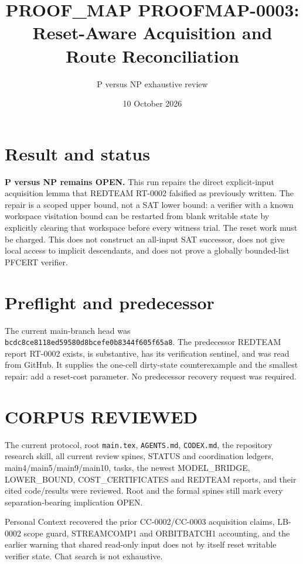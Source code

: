 \documentclass[11pt]{article}
\title{PROOF\_MAP PROOFMAP-0003: Reset-Aware Acquisition and Route Reconciliation}
\author{P versus NP exhaustive review}
\date{10 October 2026}
\begin{document}
\maketitle

\section*{Result and status}
\textbf{P versus NP remains OPEN.}  This run repairs the direct explicit-input
acquisition lemma that REDTEAM RT-0002 falsified as previously written.  The
repair is a scoped upper bound, not a SAT lower bound: a verifier with a known
workspace visitation bound can be restarted from blank writable state by
explicitly clearing that workspace before every witness trial.  The reset work
must be charged.  This does not construct an all-input SAT successor, does not
give local access to implicit descendants, and does not prove a globally
bounded-list PFCERT verifier.

\section*{Preflight and predecessor}
The current main-branch head was
\texttt{bcdc8ce8118ed59580d8bcefe0b8344f605f65a8}.  The predecessor REDTEAM
report RT-0002 exists, is substantive, has its verification sentinel, and was
read from GitHub.  It supplies the one-cell dirty-state counterexample and the
smallest repair: add a reset-cost parameter.  No predecessor recovery request
was required.

\section*{CORPUS REVIEWED}
The current protocol, root \texttt{main.tex}, \texttt{AGENTS.md},
\texttt{CODEX.md}, the repository research skill, all current review spines,
STATUS and coordination ledgers, main4/main5/main9/main10, tasks, the newest
MODEL\_BRIDGE, LOWER\_BOUND, COST\_CERTIFICATES and REDTEAM reports, and their
cited code/results were reviewed.  Root and the formal spines still mark every
separation-bearing implication OPEN.

Personal Context recovered the prior CC-0002/CC-0003 acquisition claims,
LB-0002 scope guard, STREAMCOMP1 and ORBITBATCH1 accounting, and the earlier
warning that shared read-only input does not by itself reset writable verifier
state.  Chat search is not exhaustive.
\end{document}
